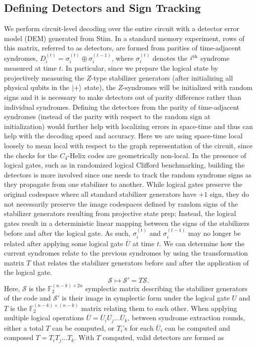 \subsection{Defining Detectors and Sign Tracking}
We perform circuit-level decoding over the entire circuit with a detector error model (DEM) generated from Stim. In a standard memory experiment, rows of this matrix, referred to as detectors, are formed from parities of time-adjacent syndromes, $D_i^{(t)} = \sigma_i^{(t)} \oplus \sigma_i^{(t-1)}$, where $\sigma_i^{(t)}$ denotes the $i^{\rm th}$ syndrome measured at time $t$. In particular, since we prepare the logical state by projectively measuring the $Z$-type stabilizer generators (after initializing all physical qubits in the $\ket{+}$ state), the $Z$-syndromes will be initialized with random signs and it is necessary to make detectors out of parity difference rather than individual syndromes. Defining the detectors from the parity of time-adjacent syndromes (instead of the parity with respect to the random sign at initialization) would further help with localizing errors in space-time and thus can help with the decoding speed and accuracy. Here we are using space-time local loosely to mean local with respect to the graph representation of the circuit, since the checks for the $C_4$-Helix codes are geometrically non-local. In the presence of logical gates, such as in randomized logical Clifford benchmarking, building the detectors is more involved since one needs to track the random syndrome signs as they propagate from one stabilizer to another. While logical gates preserve the original codespace where all standard stabilizer generators have $+1$ sign, they do not necessarily preserve the image codespaces defined by random signs of the stabilizer generators resulting from projective state prep; Instead, the logical gates result in a deterministic linear mapping between the signs of the stabilizers before and after the logical gate. As such, $\sigma_i^{(t)}$ and $\sigma_i^{(t-1)}$ may no longer be related after applying some logical gate $\overline{U}$ at time $t$. We can determine how the current syndromes relate to the previous syndromes by using the transformation matrix $T$ that relates the stabilizer generators before and after the application of the logical gate.
\begin{equation}
    \mathcal{S} \mapsto \mathcal{S}'=T\mathcal{S}.
    \label{eq:stabs}
\end{equation}
Here, $\mathcal{S}$ is the  $\mathbb{F}_2^{(n-k) \times 2n}$ symplectic matrix describing the stabilizer generators of the code and $\mathcal{S}'$ is  their image in symplectic form under the logical gate $U$ and $T$ is the $\mathbb{F}_2^{(n-k) \times (n-k)}$ matrix relating them to each other. When applying multiple logical operations $\overline{U} = \overline{U}_i\overline{U_j}...\overline{U}_k$, between syndrome extraction rounds, either a total $T$ can be computed, or $T_i$'s for each $\overline{U}_i$ can be computed and composed $T = T_iT_j...T_k$. With $T$ computed, valid detectors are formed as
